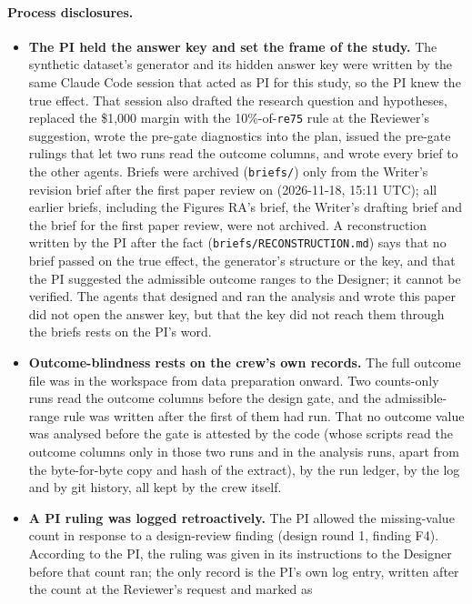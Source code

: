 \documentclass[11pt]{article}
\newcommand{\var}[1]{\texttt{#1}}
\begin{document}
\paragraph{Process disclosures.}
\begin{itemize}
\item \textbf{The PI held the answer key and set the frame of the study.} The synthetic
dataset's generator and its hidden answer key were written by the same Claude Code session
that acted as PI for this study, so the PI knew the true effect. That session also drafted
the research question and hypotheses, replaced the \$1,000 margin with the 10\%-of-\var{re75}
rule at the Reviewer's suggestion, wrote the pre-gate diagnostics into the plan, issued the
pre-gate rulings that let two runs read the outcome columns, and wrote every brief to the
other agents. Briefs were archived (\texttt{briefs/}) only from the Writer's
revision brief after the first paper review on (2026-11-18, 15:11 UTC); all earlier briefs,
including the Figures RA's brief, the Writer's drafting brief and the brief for the first
paper review, were not archived. A reconstruction written by
the PI after the fact (\texttt{briefs/RECONSTRUCTION.md}) says that no brief passed on the
true effect, the generator's structure or the key, and that the PI suggested the admissible
outcome ranges to the Designer; it cannot be verified. The agents that designed and ran the
analysis and wrote this paper did not open the answer key, but that the key did not reach
them through the briefs rests on the PI's word.
\item \textbf{Outcome-blindness rests on the crew's own records.} The full outcome file was
in the workspace from data preparation onward. Two counts-only runs read the outcome columns
before the design gate, and the admissible-range rule was written after the first of them
had run. That no outcome value was analysed before the gate is attested by the code (whose
scripts read the outcome columns only in those two runs and in the analysis runs, apart from
the byte-for-byte copy and hash of the extract), by the run ledger,
by the log and by git history, all kept by the crew itself.
\item \textbf{A PI ruling was logged retroactively.} The PI allowed the missing-value count
in response to a design-review finding (design round 1, finding F4). According to the PI, the
ruling was given in its instructions to the Designer before that count ran; the only record
is the PI's own log entry, written after the count at the Reviewer's request and marked as

\end{itemize}
\end{document}
